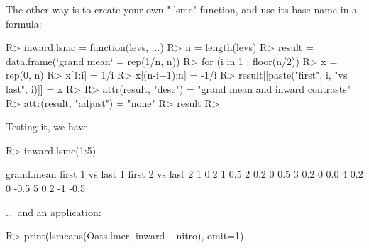 \documentclass{article}
\begin{document}
The other way is to create your own ".lsmc" function, and use its base name in a formula:
\begin{Winput}
R> inward.lsmc = function(levs, ...) {
R>     n = length(levs)
R>     result = data.frame(`grand mean` = rep(1/n, n))
R>     for (i in 1 : floor(n/2)) {
R>         x = rep(0, n)
R>         x[1:i] = 1/i
R>         x[(n-i+1):n]  = -1/i
R>         result[[paste("first", i, "vs last", i)]] = x
R>     }
R>     attr(result, "desc") = "grand mean and inward contrasts"
R>     attr(result, "adjust") = "none"
R>     result
R> }
\end{Winput}
Testing it, we have
\begin{Winput}
R> inward.lsmc(1:5)
\end{Winput}
\begin{Woutput}
  grand.mean first 1 vs last 1 first 2 vs last 2
1        0.2                 1               0.5
2        0.2                 0               0.5
3        0.2                 0               0.0
4        0.2                 0              -0.5
5        0.2                -1              -0.5
\end{Woutput}
\ldots\ and an application:
\begin{Winput}
R> print(lsmeans(Oats.lmer, inward ~ nitro), omit=1)
\end{Winput}
\end{document}
